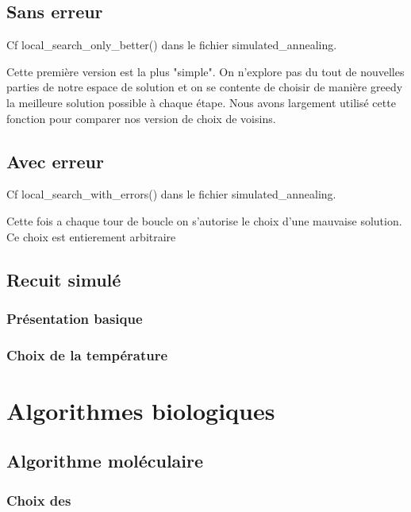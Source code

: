 \documentclass[10pt,a4paper]{article}
\begin{document}
\subsection{Sans erreur}


Cf local\_search\_only\_better() dans le fichier simulated\_annealing.

Cette première version est la plus "simple". On n'explore pas du tout de nouvelles parties de notre espace de solution et on se contente de choisir de manière greedy la meilleure solution possible à chaque étape. Nous avons largement utilisé cette fonction pour comparer nos version de choix de voisins. 

\subsection{Avec erreur}

Cf local\_search\_with\_errors() dans le fichier simulated\_annealing.

Cette fois a chaque tour de boucle on s'autorise le choix d'une mauvaise solution. Ce choix est entierement arbitraire 


\subsection{Recuit simulé}

\subsubsection{Présentation basique}

\subsubsection{Choix de la température}

\section{Algorithmes biologiques}

\subsection{Algorithme moléculaire}

\subsubsection{Choix des }
\end{document}
